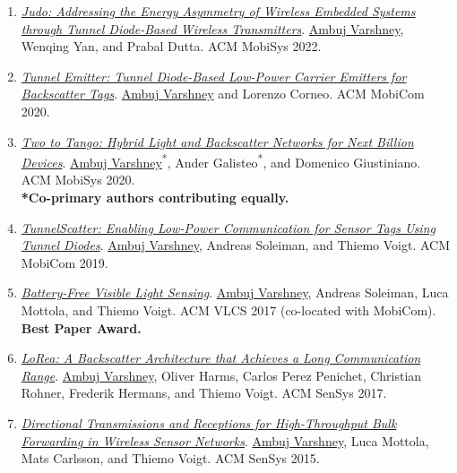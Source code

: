 \begin{enumerate}[itemsep=1.2em, topsep=0.6em]
\item
\emph{\href{https://dl.acm.org/doi/10.1145/3498361.3538923}{Judo: Addressing the Energy Asymmetry of Wireless Embedded Systems through Tunnel Diode-Based Wireless Transmitters}}.
\underline{Ambuj Varshney}, Wenqing Yan\phd, and Prabal Dutta.
\textcolor{accent}{ACM MobiSys 2022}.

\item
\emph{\href{https://dl.acm.org/doi/10.1145/3372224.3419199}{Tunnel Emitter: Tunnel Diode-Based Low-Power Carrier Emitters for Backscatter Tags}}.
\underline{Ambuj Varshney} and Lorenzo Corneo.
\textcolor{accent}{ACM MobiCom 2020}.

\item
\emph{\href{https://dl.acm.org/doi/10.1145/3386901.3388918}{Two to Tango: Hybrid Light and Backscatter Networks for Next Billion Devices}}.
\underline{Ambuj Varshney}\textsuperscript{*}, Ander Galisteo\textsuperscript{*}, and Domenico Giustiniano.
\textcolor{accent}{ACM MobiSys 2020}.\\
\textbf{*Co-primary authors contributing equally.}

\item
\emph{\href{https://dl.acm.org/doi/10.1145/3300061.3345451}{TunnelScatter: Enabling Low-Power Communication for Sensor Tags Using Tunnel Diodes}}.
\underline{Ambuj Varshney}, Andreas Soleiman\pg, and Thiemo Voigt.
\textcolor{accent}{ACM MobiCom 2019}.

\item
\emph{\href{https://dl.acm.org/doi/10.1145/3129881.3129890}{Battery-Free Visible Light Sensing}}.
\underline{Ambuj Varshney}, Andreas Soleiman\pg, Luca Mottola, and Thiemo Voigt.
\textcolor{accent}{ACM VLCS 2017 (co-located with MobiCom)}.\\
\textbf{Best Paper Award.}

\item
\emph{\href{https://dl.acm.org/citation.cfm?id=3131691}{LoRea: A Backscatter Architecture that Achieves a Long Communication Range}}.
\underline{Ambuj Varshney}, Oliver Harms\pg, Carlos Perez Penichet, Christian Rohner, Frederik Hermans, and Thiemo Voigt.
\textcolor{accent}{ACM SenSys 2017}.

\item
\emph{\href{https://dl.acm.org/doi/10.1145/2809695.2809720}{Directional Transmissions and Receptions for High-Throughput Bulk Forwarding in Wireless Sensor Networks}}.
\underline{Ambuj Varshney}, Luca Mottola, Mats Carlsson, and Thiemo Voigt.
\textcolor{accent}{ACM SenSys 2015}.

\end{enumerate}
